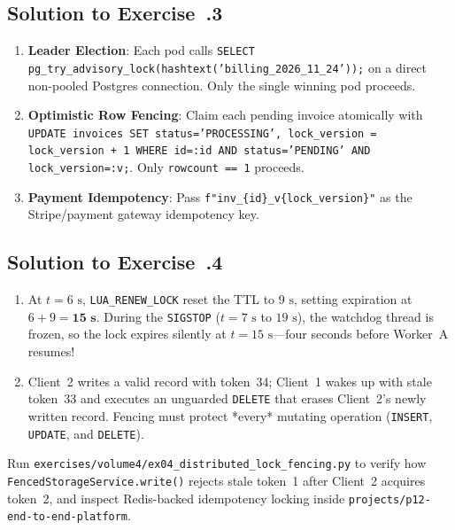 \subsection*{Solution to Exercise~\thechapter.3}
\begin{enumerate}[leftmargin=18pt]
  \item \textbf{Leader Election}: Each pod calls \texttt{SELECT pg\_try\_advisory\_lock(hashtext('billing\_2026\_11\_24'));} on a direct non-pooled Postgres connection. Only the single winning pod proceeds.
  \item \textbf{Optimistic Row Fencing}: Claim each pending invoice atomically with \texttt{UPDATE invoices SET status='PROCESSING', lock\_version = lock\_version + 1 WHERE id=:id AND status='PENDING' AND lock\_version=:v;}. Only \texttt{rowcount == 1} proceeds.
  \item \textbf{Payment Idempotency}: Pass \texttt{f"inv\_\{id\}\_v\{lock\_version\}"} as the Stripe/payment gateway idempotency key.
\end{enumerate}

\subsection*{Solution to Exercise~\thechapter.4}
\begin{enumerate}[leftmargin=18pt]
  \item At $t=6\text{ s}$, \texttt{LUA\_RENEW\_LOCK} reset the TTL to $9\text{ s}$, setting expiration at $6 + 9 = \mathbf{15\text{ s}}$. During the \texttt{SIGSTOP} ($t=7\text{ s}$ to $19\text{ s}$), the watchdog thread is frozen, so the lock expires silently at $t=15\text{ s}$---four seconds before Worker~A resumes!
  \item Client~2 writes a valid record with token~34; Client~1 wakes up with stale token~33 and executes an unguarded \texttt{DELETE} that erases Client~2's newly written record. Fencing must protect *every* mutating operation (\texttt{INSERT}, \texttt{UPDATE}, and \texttt{DELETE}).
\end{enumerate}

\begin{labbridgebox}
Run \texttt{exercises/volume4/ex04\_distributed\_lock\_fencing.py} to verify how \texttt{FencedStorageService.write()} rejects stale token~1 after Client~2 acquires token~2, and inspect Redis-backed idempotency locking inside \texttt{projects/p12-end-to-end-platform}.
\end{labbridgebox}

